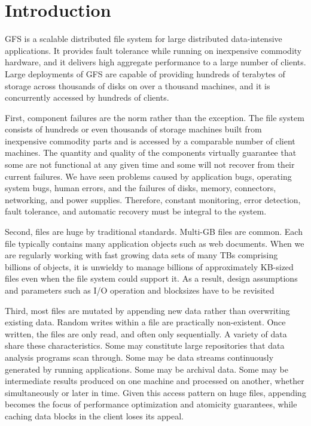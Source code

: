 \documentclass{article}
\begin{document}
\section{Introduction}
GFS is a scalable distributed file system for large distributed data-intensive
applications. It provides fault tolerance while running on inexpensive
commodity hardware, and it delivers high aggregate performance to a large
number of clients. Large deployments of GFS are capable of providing hundreds
of terabytes of storage across thousands of disks on over a thousand machines,
and it is concurrently accessed by hundreds of clients.

First, component failures are the norm rather than the
exception. The file system consists of hundreds or even
thousands of storage machines built from inexpensive commodity parts and is accessed by a comparable number of
client machines. The quantity and quality of the components virtually guarantee that some are not functional at
any given time and some will not recover from their current failures. We have seen problems caused by application
bugs, operating system bugs, human errors, and the failures
of disks, memory, connectors, networking, and power supplies. Therefore, constant monitoring, error detection, fault
tolerance, and automatic recovery must be integral to the
system.

Second, files are huge by traditional standards. Multi-GB
files are common. Each file typically contains many application objects such as web documents. When we are regularly
working with fast growing data sets of many TBs comprising
billions of objects, it is unwieldy to manage billions of approximately KB-sized files even when the file system could
support it. As a result, design assumptions and parameters
such as I/O operation and blocksizes have to be revisited

Third, most files are mutated by appending new data rather than overwriting
existing data. Random writes within a file are practically non-existent. Once
written, the files are only read, and often only sequentially. A variety of
data share these characteristics. Some may constitute large repositories that
data analysis programs scan through. Some may be data streams continuously
generated by running applications. Some may be archival data. Some may be
intermediate results produced on one machine and processed on another, whether
simultaneously or later in time. Given this access pattern on huge files,
appending becomes the focus of performance optimization and atomicity
guarantees, while caching data blocks in the client loses its appeal.
\end{document}
